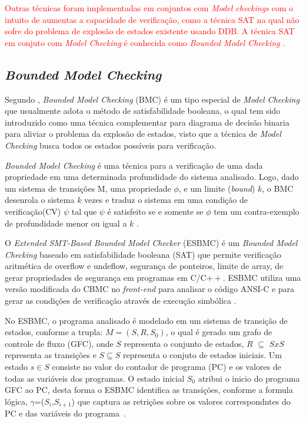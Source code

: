 \par
\textcolor{red}{Outras técnicas foram implementadas em conjuntos com \textit{Model checkings} com o intuito de aumentas a capacidade de verificação, como a técnica SAT na qual não sofre do problema de explosão de estados existente usando DDB. A técnica SAT em conjuto com \textit{Model Checking} é conhecida como \textit{Bounded Model Checking} \cite{biere2003bounded}.}
\subsection{\label{cap:bounded}\textit{Bounded Model Checking}}
Segundo \citeauthor{rocha2015verificaccao}, \textit{Bounded Model Checking} (BMC) é um tipo especial de \textit{Model Checking} que usualmente adota o método de satisfabilidade booleana, o qual tem sido introduzido como uma técnica complementar para diagrama de decisão binaria para aliviar o problema da explosão de estados, visto que a técnica de \textit{Model Checking} busca todos os estados possíveis para verificação.

\par
\textit{Bounded Model Checking} é uma técnica para a verificação de uma dada propriedade em uma determinada profundidade do sistema analisado. Logo, dado um sistema de transições M, uma propriedade $\phi$, e um limite (\textit{bound}) $k$, o BMC desenrola o sistema $k$ vezes e traduz o sistema em uma condição de verificação(CV) $\psi$ tal que $\psi$ é satisfeito se e somente se $\phi$ tem um contra-exemplo de profundidade menor ou igual a $k$ \cite{rocha2015verificaccao}.

\par
O \textit{Extended SMT-Based Bounded Model Checker} (ESBMC) é um \textit{Bounded Model Checking} baseado em satisfabilidade booleana (SAT) que permite verificação aritmética de overflow e undeflow, segurança de ponteiros, limite de array, de gerar propriedades de segurança em programas em C/C$++$. ESBMC utiliza uma versão modificada do CBMC no \textit{front-end} para analisar o código ANSI-C e para gerar as condições de verificação através de execução simbólica \cite{cordeiro2012smt,rocha2015verificaccao}.

\par
No ESBMC, o programa analisado é modelado em um sistema de transição de estados, conforme a trupla: $M=(S,R,S_{0})$, o qual é gerado um grafo de controle de fluxo (GFC), onde $S$ representa o conjunto de estados, $R$ $\subseteq$ $SxS$ representa as transições e $S \subseteq S$ representa o conjuto de estados iniciais. Um estado $s \in S$ consiste no valor do contador de programa (PC) e os valores de todas as variáveis dos programas. O estado inicial $S_{0}$ atribui o inicio do programa GFC ao PC, desta forma o ESBMC identifica as transições, conforme a formula lógica, $\gamma$=($S_{i}$,$S_{i+1}$) que captura as retrições sobre os valores correspondntes do PC e das variáveis do programa~\cite{cordeiro2012smt}.

